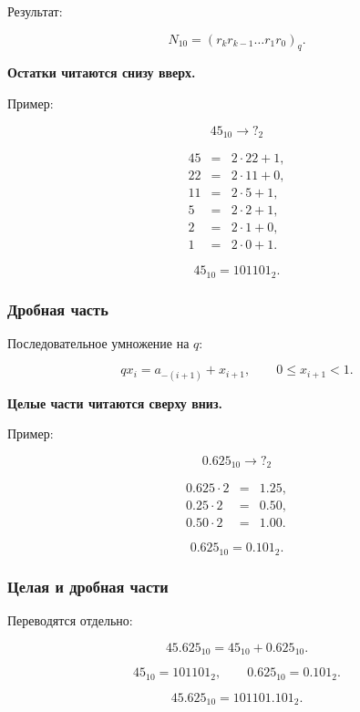\documentclass[../final.tex]{subfiles}
\begin{document}
Результат:

\[
N_{10}
=
(r_k r_{k-1}\ldots r_1r_0)_q.
\]

\textcolor{rc3}{\bfseries Остатки читаются снизу вверх.}

\medskip

Пример:

\[
45_{10}\longrightarrow ?_2
\]

\[
\begin{array}{rcl}
45 &=& 2\cdot22+1,\\
22 &=& 2\cdot11+0,\\
11 &=& 2\cdot5+1,\\
5  &=& 2\cdot2+1,\\
2  &=& 2\cdot1+0,\\
1  &=& 2\cdot0+1.
\end{array}
\]

\[
45_{10}=101101_2.
\]


\subsubsection{Дробная часть}

Последовательное умножение на $q$:

\[
qx_i=a_{-(i+1)}+x_{i+1},
\qquad
0\leq x_{i+1}<1.
\]

\textcolor{rc3}{\bfseries Целые части читаются сверху вниз.}

\medskip

Пример:

\[
0.625_{10}\longrightarrow ?_2
\]

\[
\begin{array}{rcl}
0.625\cdot2 &=& 1.25,\\
0.25 \cdot2 &=& 0.50,\\
0.50 \cdot2 &=& 1.00.
\end{array}
\]

\[
0.625_{10}=0.101_2.
\]


\subsubsection{Целая и дробная части}

Переводятся отдельно:

\[
45.625_{10}
=
45_{10}+0.625_{10}.
\]

\[
45_{10}=101101_2,
\qquad
0.625_{10}=0.101_2.
\]

\[
45.625_{10}=101101.101_2.
\]


\end{document}
